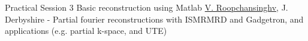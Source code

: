 
    \begin{abstract_online}{Practical Session 3 Basic reconstruction using Matlab}{%
        \underline{V. Roopchansinghv}, J. Derbyshire}{%
        }{%
        -}
    Partial fourier reconstructions with ISMRMRD and Gadgetron, and applications (e.g. partial k-space, and UTE) 
    
    \end{abstract_online}
    